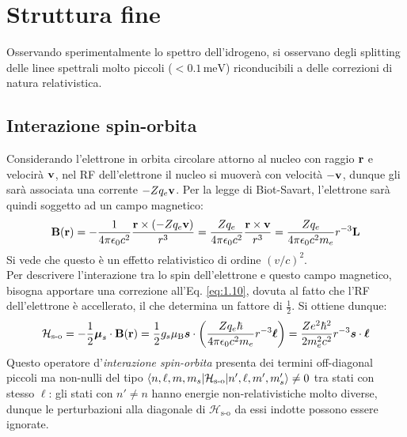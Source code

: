 \section{Struttura fine}

Osservando sperimentalmente lo spettro dell'idrogeno, si osservano degli splitting delle linee spettrali molto piccoli ($ < 0.1 \,\text{meV} $) riconducibili a delle correzioni di natura relativistica.

\subsection{Interazione spin-orbita}

Considerando l'elettrone in orbita circolare attorno al nucleo con raggio $ \mathbf{r} $ e velocirà $ \mathbf{v} $, nel RF dell'elettrone il nucleo si muoverà con velocità $ -\mathbf{v} $, dunque gli sarà associata una corrente $ -Zq_e \mathbf{v} $. Per la legge di Biot-Savart, l'elettrone sarà quindi soggetto ad un campo magnetico:
\begin{equation*}
	\mathbf{B}(\mathbf{r}) = - \frac{1}{4\pi \epsilon_0 c^2} \frac{\mathbf{r} \times (-Zq_e \mathbf{v})}{r^3} = \frac{Zq_e}{4\pi \epsilon_0 c^2} \frac{\mathbf{r} \times \mathbf{v}}{r^3} = \frac{Zq_e}{4\pi \epsilon_0 c^2 m_e} r^{-3} \mathbf{L}
\end{equation*}
Si vede che questo è un effetto relativistico di ordine $ (v/c)^2 $.\\
Per descrivere l'interazione tra lo spin dell'elettrone e questo campo magnetico, bisogna apportare una correzione all'Eq. \ref{eq:1.10}, dovuta al fatto che l'RF dell'elettrone è accellerato, il che determina un fattore di $ \frac{1}{2} $. Si ottiene dunque:
\begin{equation*}
	\mathcal{H}_\text{s-o} = - \frac{1}{2} \boldsymbol{\mu}_s \cdot \mathbf{B}(\mathbf{r}) = \frac{1}{2} g_s \mu_\text{B} \boldsymbol{s} \cdot \left( \frac{Zq_e \hbar}{4\pi \epsilon_0 c^2 m_e} r^{-3} \boldsymbol{\ell} \right) = \frac{Ze^2 \hbar^2}{2m_e^2 c^2} r^{-3} \boldsymbol{s} \cdot \boldsymbol{\ell}
\end{equation*}
Questo operatore d'\textit{interazione spin-orbita} presenta dei termini off-diagonal piccoli ma non-nulli del tipo $ \braket{n,\ell,m,m_s | \mathcal{H}_\text{s-o} | n',\ell,m',m_s'} \neq 0 $ tra stati con stesso $ \ell $: gli stati con $ n' \neq n $ hanno energie non-relativistiche molto diverse, dunque le perturbazioni alla diagonale di $ \mathcal{H}_\text{s-o} $ da essi indotte possono essere ignorate. 

